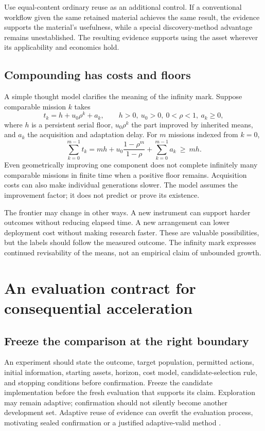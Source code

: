 \documentclass[11pt,letterpaper]{article}
\theoremstyle{remark}\newtheorem{remark}{Remark}[section]
\begin{document}
Use equal-content ordinary reuse as an additional control.
If a conventional workflow given the same retained material achieves the same result, the evidence supports the material's usefulness, while a special discovery-method advantage remains unestablished.
The resulting evidence supports using the asset wherever its applicability and economics hold.

\subsection{Compounding has costs and floors}
A simple thought model clarifies the meaning of the infinity mark.
Suppose comparable mission $k$ takes
\begin{equation}\label{eq:floor}
 t_k=h+u_0\rho^k+a_k,\qquad
 h>0,\ u_0>0,\ 0<\rho<1,\ a_k\ge0,
\end{equation}
where $h$ is a persistent serial floor, $u_0\rho^k$ the part improved by inherited means, and $a_k$ the acquisition and adaptation delay.
For $m$ missions indexed from $k=0$,
\begin{equation}\label{eq:sumfloor}
 \sum_{k=0}^{m-1}t_k
 =mh+u_0\frac{1-\rho^m}{1-\rho}+\sum_{k=0}^{m-1}a_k
 \ \ge\ mh.
\end{equation}
Even geometrically improving one component does not complete infinitely many comparable missions in finite time when a positive floor remains.
Acquisition costs can also make individual generations slower.
The model assumes the improvement factor; it does not predict or prove its existence.

The frontier may change in other ways.
A new instrument can support harder outcomes without reducing elapsed time.
A new arrangement can lower deployment cost without making research faster.
These are valuable possibilities, but the labels should follow the measured outcome.
The infinity mark expresses continued revisability of the means, not an empirical claim of unbounded growth.

\section{An evaluation contract for consequential acceleration}\label{sec:evaluation}

\subsection{Freeze the comparison at the right boundary}
An experiment should state the outcome, target population, permitted actions, initial information, starting assets, horizon, cost model, candidate-selection rule, and stopping conditions before confirmation.
Freeze the candidate implementation before the fresh evaluation that supports its claim.
Exploration may remain adaptive; confirmation should not silently become another development set.
Adaptive reuse of evidence can overfit the evaluation process, motivating sealed confirmation or a justified adaptive-valid method \citep{dwork2015holdout}.
\end{document}
